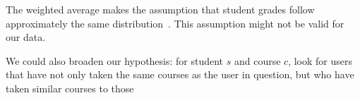 The weighted average makes the assumption that student grades follow approximately the same distribution~\cite{herlocker}.  This assumption might not be valid for our data.  

We could also broaden our hypothesis: for student $s$ and course $c$, look for users that have not only taken the same courses as the user in question, but who have taken similar courses to those  
